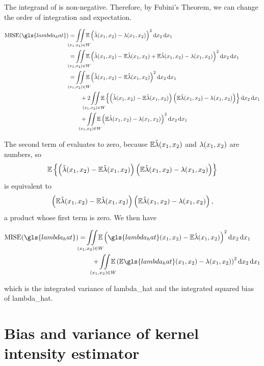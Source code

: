 The integrand of  is non-negative.
Therefore, by Fubini's Theorem, we can change the order of integration and expectation.

\begin{align}
    \mbox{MISE}(\gls{lambda_hat}) & = \iintW{ \E \left( \hat{\lambda}\xvec - \lambda\xvec \right)^2 } \nonumber \\
                & = \iintW{ \E \left( \hat{\lambda}\xvec - \E \hat{\lambda}\xvec + \E \hat{\lambda}\xvec - \lambda\xvec \right)^2 } \nonumber \\
                & = \iintW{ \E \left( \hat{\lambda}\xvec - \E \hat{\lambda}\xvec \right)^2 } \nonumber \\
                    & \qquad + 2 \iintW{
                    \E \left\{
                        \left( \hat{\lambda}\xvec - \E \hat{\lambda}\xvec \right)
                        \left( \E \hat{\lambda}\xvec - \lambda\xvec \right)
                    \right\} } \nonumber \\
                    & \qquad + \iintW{ \E \left( \E \hat{\lambda}\xvec - \lambda\xvec \right)^2 } \label{eq:mise_expanded}
\end{align}

The second term of  evaluates to zero,
because $\mathbb{E} \hat{\lambda}(x_1, x_2)$ and $\lambda(x_1, x_2)$ are numbers,
so
$$\mathbb{E} \left\{
    \left( \hat{\lambda}(x_1, x_2) - \mathbb{E} \hat{\lambda}(x_1, x_2) \right)
    \left( \mathbb{E} \hat{\lambda}(x_1, x_2) - \lambda(x_1, x_2) \right)
\right\}
$$
is equivalent to
$$ 
\left( \mathbb{E} \hat{\lambda}(x_1, x_2) - \mathbb{E} \hat{\lambda}(x_1, x_2) \right)
\left( \mathbb{E} \hat{\lambda}(x_1, x_2) - \lambda(x_1, x_2) \right) \text{,}
$$
a product whose first term is zero.
We then have 

\begin{align}
    \mbox{MISE}(\gls{lambda_hat}) & = \iintW{
        \E \left( \gls{lambda_hat}\xvec - \E \hat{\lambda}\xvec \right)^2 } \nonumber \\%
                                  & \qquad %
        + \iintW{ \E \left( \E \gls{lambda_hat}\xvec - \lambda\xvec \right)^2 } \label{eq:mise_bias_variance}%
\end{align}

which is the integrated variance of \gls{lambda_hat} and the integrated squared bias of \gls{lambda_hat}.

\section{Bias and variance of kernel intensity estimator}
\label{sec:theory:bias_variance}


